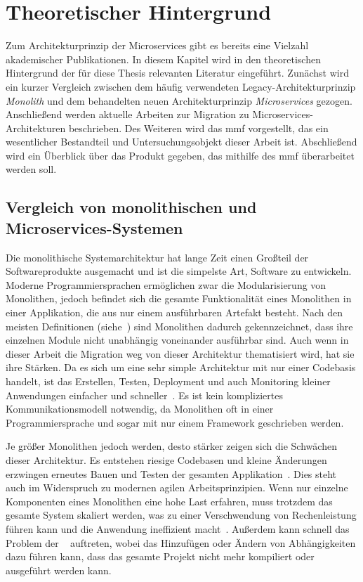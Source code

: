 \chapter{Theoretischer Hintergrund}
\label{chap:theoretischer-hintergrund}
Zum Architekturprinzip der Microservices gibt es bereits eine Vielzahl akademischer Publikationen.
In diesem Kapitel wird in den theoretischen Hintergrund der für diese Thesis relevanten Literatur eingeführt.
Zunächst wird ein kurzer Vergleich zwischen dem häufig verwendeten Legacy-Architekturprinzip \emph{Monolith} und dem behandelten neuen Architekturprinzip \emph{Microservices} gezogen.
Anschließend werden aktuelle Arbeiten zur Migration zu Microservices-Architekturen beschrieben.
Des Weiteren wird das \acrfull{mmf} vorgestellt, das ein wesentlicher Bestandteil und Untersuchungsobjekt dieser Arbeit ist.
Abschließend wird ein Überblick über das Produkt gegeben, das mithilfe des \gls{mmf} überarbeitet werden soll.

\section{Vergleich von monolithischen und Microservices-Systemen}
\label{sec:monolith-vs-microservices}

Die monolithische Systemarchitektur hat lange Zeit einen Großteil der Softwareprodukte ausgemacht und ist die simpelste Art, Software zu entwickeln.
Moderne Programmiersprachen ermöglichen zwar die Modularisierung von Monolithen, jedoch befindet sich die gesamte Funktionalität eines Monolithen in einer Applikation, die aus nur einem ausführbaren Artefakt besteht.
Nach den meisten Definitionen (siehe~\cite{Dragoni2017}) sind Monolithen dadurch gekennzeichnet, dass ihre einzelnen Module nicht unabhängig voneinander ausführbar sind.
Auch wenn in dieser Arbeit die Migration weg von dieser Architektur thematisiert wird, hat sie ihre Stärken.
Da es sich um eine sehr simple Architektur mit nur einer Codebasis handelt, ist das Erstellen, Testen, Deployment und auch Monitoring kleiner Anwendungen einfacher und schneller~\cite{a-survey-on}.
Es ist kein kompliziertes Kommunikationsmodell notwendig, da Monolithen oft in einer Programmiersprache und sogar mit nur einem Framework geschrieben werden.

Je größer Monolithen jedoch werden, desto stärker zeigen sich die Schwächen dieser Architektur.
Es entstehen riesige Codebasen und kleine Änderungen erzwingen erneutes Bauen und Testen der gesamten Applikation~\cite{Dragoni2017}.
Dies steht auch im Widerspruch zu modernen agilen Arbeitsprinzipien.
Wenn nur einzelne Komponenten eines Monolithen eine hohe Last erfahren, muss trotzdem das gesamte System skaliert werden, was zu einer Verschwendung von Rechenleistung führen kann und die Anwendung ineffizient macht~\cite{Dragoni2017}.
Außerdem kann schnell das Problem der ~\cite{Dragoni2017} auftreten, wobei das Hinzufügen oder Ändern von Abhängigkeiten dazu führen kann, dass das gesamte Projekt nicht mehr kompiliert oder ausgeführt werden kann.

